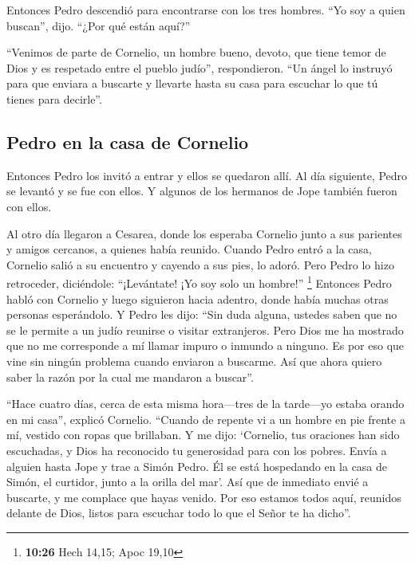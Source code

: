  Entonces Pedro descendió para encontrarse con los tres
hombres. ``Yo soy a quien buscan'', dijo. ``¿Por qué están aquí?''

 ``Venimos de parte de Cornelio, un hombre bueno, devoto,
que tiene temor de Dios y es respetado entre el pueblo judío'',
respondieron. ``Un ángel lo instruyó para que enviara a buscarte y
llevarte hasta su casa para escuchar lo que tú tienes para decirle''.

\hypertarget{pedro-en-la-casa-de-cornelio}{%
\subsection{Pedro en la casa de
Cornelio}\label{pedro-en-la-casa-de-cornelio}}

 Entonces Pedro los invitó a entrar y ellos se quedaron
allí. Al día siguiente, Pedro se levantó y se fue con ellos. Y algunos
de los hermanos de Jope también fueron con ellos.

 Al otro día llegaron a Cesarea, donde los esperaba
Cornelio junto a sus parientes y amigos cercanos, a quienes había
reunido.  Cuando Pedro entró a la casa, Cornelio salió a
su encuentro y cayendo a sus pies, lo adoró.  Pero Pedro
lo hizo retroceder, diciéndole: ``¡Levántate! ¡Yo soy solo un hombre!''
\footnote{\textbf{10:26} Hech 14,15; Apoc 19,10} 
Entonces Pedro habló con Cornelio y luego siguieron hacia adentro, donde
había muchas otras personas esperándolo.  Y Pedro les
dijo: ``Sin duda alguna, ustedes saben que no se le permite a un judío
reunirse o visitar extranjeros. Pero Dios me ha mostrado que no me
corresponde a mí llamar impuro o inmundo a ninguno.  Es
por eso que vine sin ningún problema cuando enviaron a buscarme. Así que
ahora quiero saber la razón por la cual me mandaron a buscar''.

 ``Hace cuatro días, cerca de esta misma hora---tres de
la tarde---yo estaba orando en mi casa'', explicó Cornelio. ``Cuando de
repente vi a un hombre en pie frente a mí, vestido con ropas que
brillaban.  Y me dijo: `Cornelio, tus oraciones han sido
escuchadas, y Dios ha reconocido tu generosidad para con los pobres.
 Envía a alguien hasta Jope y trae a Simón Pedro. Él se
está hospedando en la casa de Simón, el curtidor, junto a la orilla del
mar'.  Así que de inmediato envié a buscarte, y me
complace que hayas venido. Por eso estamos todos aquí, reunidos delante
de Dios, listos para escuchar todo lo que el Señor te ha dicho''.

